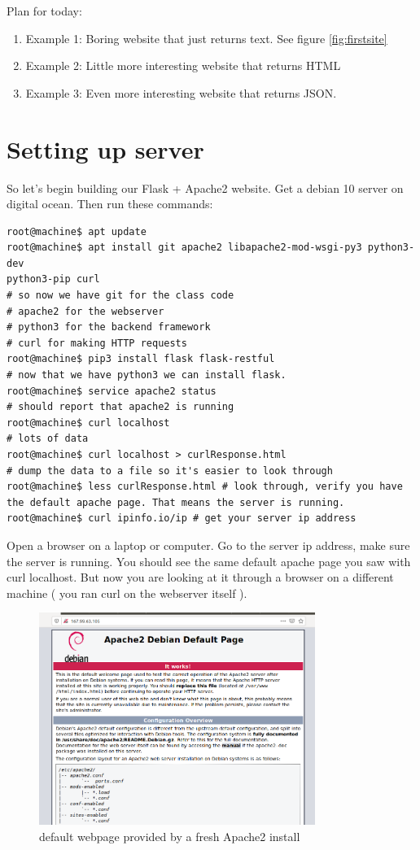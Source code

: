 \documentclass[10pt]{article}
\begin{document}
Plan for today:
\begin{enumerate}
\item Example 1: Boring website that just returns text. See figure
\ref{fig:firstsite}
\item Example 2: Little more interesting website that returns HTML
\item Example 3: Even more interesting website that returns JSON.
\end{enumerate}

\section{Setting up server}
So let's begin building our Flask + Apache2 website. Get a debian 10 server on
digital ocean. Then run these commands:

\begin{lstlisting}[style=term, caption=configure your server, label=lst:install]
root@machine$ apt update
root@machine$ apt install git apache2 libapache2-mod-wsgi-py3 python3-dev
python3-pip curl
# so now we have git for the class code
# apache2 for the webserver
# python3 for the backend framework
# curl for making HTTP requests
root@machine$ pip3 install flask flask-restful
# now that we have python3 we can install flask.
root@machine$ service apache2 status
# should report that apache2 is running
root@machine$ curl localhost
# lots of data
root@machine$ curl localhost > curlResponse.html
# dump the data to a file so it's easier to look through
root@machine$ less curlResponse.html # look through, verify you have the default apache page. That means the server is running.
root@machine$ curl ipinfo.io/ip # get your server ip address
\end{lstlisting}

Open a browser on a laptop or computer. Go to the server ip address, make sure the server is running. You should see the same default apache page you saw with curl localhost. But now you are looking at it through a browser on a different machine ( you ran curl on the webserver itself ).

\begin{figure}[h]
  \centering
    \includegraphics[width=0.8\textwidth]{defaultApache.png}
  \caption{default webpage provided by a fresh Apache2 install}
	\label{fig:default}
\end{figure}
\end{document}
